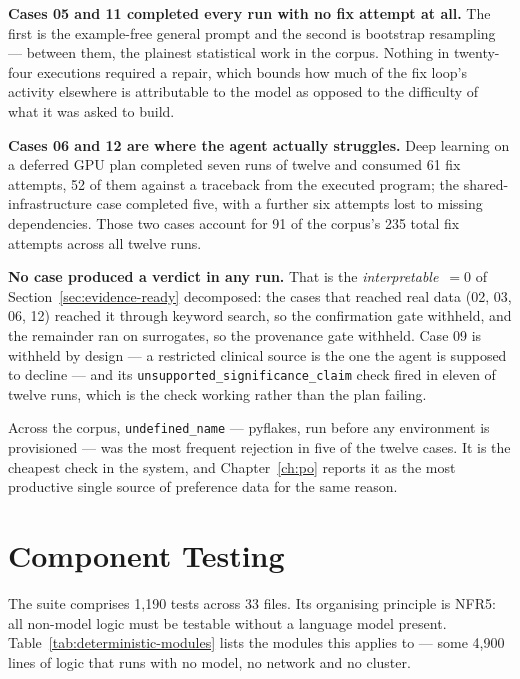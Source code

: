 \textbf{Cases 05 and 11 completed every run with no fix attempt at all.} The
first is the example-free general prompt and the second is bootstrap resampling
--- between them, the plainest statistical work in the corpus. Nothing in
twenty-four executions required a repair, which bounds how much of the fix
loop's activity elsewhere is attributable to the model as opposed to the
difficulty of what it was asked to build.

\textbf{Cases 06 and 12 are where the agent actually struggles.} Deep learning
on a deferred GPU plan completed seven runs of twelve and consumed 61 fix
attempts, 52 of them against a traceback from the executed program; the
shared-infrastructure case completed five, with a further six attempts lost to
missing dependencies. Those two cases account for 91 of the corpus's 235 total
fix attempts across all twelve runs.

\textbf{No case produced a verdict in any run.} That is the
\emph{interpretable}~$=0$ of Section~\ref{sec:evidence-ready} decomposed: the
cases that reached real data (02, 03, 06, 12) reached it through keyword search,
so the confirmation gate withheld, and the remainder ran on surrogates, so the
provenance gate withheld. Case 09 is withheld by design --- a restricted
clinical source is the one the agent is supposed to decline --- and its
\texttt{unsupported\_significance\_claim} check fired in eleven of twelve runs,
which is the check working rather than the plan failing.

Across the corpus, \texttt{undefined\_name} --- pyflakes, run before any
environment is provisioned --- was the most frequent rejection in five of the
twelve cases. It is the cheapest check in the system, and
Chapter~\ref{ch:po} reports it as the most productive single source of
preference data for the same reason.

\chapter{Component Testing}
\label{app:component-testing}

The suite comprises 1{,}190 tests across 33 files. Its organising principle is
NFR5: all non-model logic must be testable without a language model present.
Table~\ref{tab:deterministic-modules} lists the modules this applies to --- some
4{,}900 lines of logic that runs with no model, no network and no cluster.

